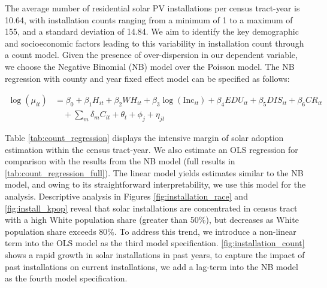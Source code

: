 \documentclass[11pt,twoside,letterpaper]{article}
\begin{document}
The average number of residential solar PV installations per census tract-year is 10.64, with installation counts ranging from a minimum of 1 to a maximum of 155, and a standard deviation of 14.84. We aim to identify the key demographic and socioeconomic factors leading to this variability in installation count through a count model. Given the presence of over-dispersion in our dependent variable, we choose the Negative Binomial (NB) model over the Poisson model. The NB regression with county and year fixed effect model can be specified as follows:

\begin{equation}
\label{reg_2}
\begin{aligned}
\log(\mu_{it}) &= \beta_{0} + \beta_{1}H_{it} + \beta_{2}WH_{it} + \beta_{3}\log(\text{Inc}_{it}) + \beta_{4}EDU_{it} + \beta_{5}DIS_{it} + \beta_{6}CR_{it} \\
&\quad + \sum_{m}\delta_{m}C_{it} + \theta_{t} + \phi_{j} + \eta_{jt}
\end{aligned}
\end{equation}

Table \ref{tab:count_regression} displays the intensive margin of solar adoption estimation within the census tract-year. We also estimate an OLS regression for comparison with the results from the NB model (full results in \autoref{tab:count_regression_full}). The linear model yields estimates similar to the NB model, and owing to its straightforward interpretability, we use this model for the analysis. Descriptive analysis in Figures \ref{fig:installation_race} and \ref{fig:install_kpop} reveal that solar installations are concentrated in census tract with a high White population share (greater than 50\%), but decreases as White population share exceeds 80\%. To address this trend, we introduce a non-linear term into the OLS model as the third model specification. \autoref{fig:installation_count} shows a rapid growth in solar installations in past years, to capture the impact of past installations on current installations, we add a lag-term into the NB model as the fourth model specification. 
\end{document}
